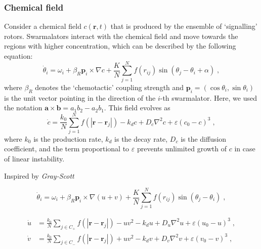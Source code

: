 \documentclass{article}
\begin{document}
\subsubsection{Chemical field}

\noindent Consider a chemical field $c\left( \mathbf{r},t \right)$ that is produced by the ensemble of ‘signalling’ rotors. Swarmalators interact with the chemical field and move towards the regions with higher concentration, which can be described by the following equation:
\begin{equation}
    \dot{\theta}_i=\omega _i+\beta _R\mathbf{p}_i\times \nabla c+\frac{K}{N}\sum_{j=1}^N{f}\left( r_{ij} \right) \sin \left( \theta _j-\theta _i+\alpha \right) \;,
\end{equation}
where $\beta _R$ denotes the ‘chemotactic’ coupling strength and $\mathbf{p}_i=(\cos \theta _i,\sin \theta _i)$ is the unit vector pointing in the direction of the $i$-th swarmalator. Here, we used the notation $\mathbf{a}\times\mathbf{b}=a_1 b_2-a_2 b_1$.
This field evolves as
\begin{equation}
    \dot{c}=\frac{k_0}{N}\sum_{j=1}^N{f\left( \left| \mathbf{r}-\mathbf{r}_j \right| \right)}-k_dc+D_c\nabla ^2c+\varepsilon \left( c_0-c \right) ^3\;,
\end{equation}
where $k_0$ is the production rate, $k_d$ is the decay rate, $D_c$ is the diffusion coefficient, and the term proportional to $\varepsilon$ prevents unlimited growth of $c$ in case of linear instability.


Inspired by \textit{Gray-Scott}

\begin{equation}
    \dot{\theta}_i=\omega _i+\beta _R\mathbf{p}_i\times \nabla \left( u+v \right) +\frac{K}{N}\sum_{j=1}^N{f}\left( r_{ij} \right) \sin \left( \theta _j-\theta _i \right) \;,
\end{equation}

\begin{subequations}
    \begin{align}
        \dot{u}&=\frac{k_0}{N}\sum_{j\in C_+}{f\left( \left| \mathbf{r}-\mathbf{r}_j \right| \right)}-uv^2-k_du+D_u\nabla ^2u+\varepsilon \left( u_0-u \right) ^3\;,
        \\
        \dot{v}&=\frac{k_0}{N}\sum_{j\in C_-}{f\left( \left| \mathbf{r}-\mathbf{r}_j \right| \right)}+uv^2-k_dv+D_v\nabla ^2v+\varepsilon \left( v_0-v \right) ^3\;,
    \end{align}
\end{subequations}
\end{document}
